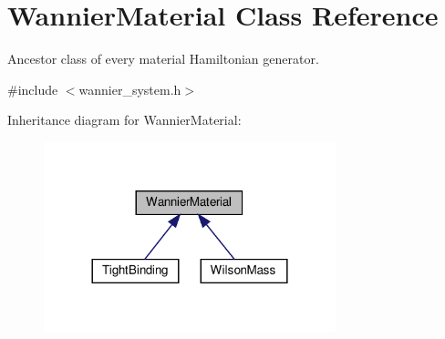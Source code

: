 \hypertarget{class_wannier_material}{}\section{Wannier\+Material Class Reference}
\label{class_wannier_material}


Ancestor class of every material Hamiltonian generator.  




{\ttfamily \#include $<$wannier\+\_\+system.\+h$>$}



Inheritance diagram for Wannier\+Material\+:
\nopagebreak
\begin{figure}[H]
\begin{center}
\leavevmode
\includegraphics[width=240pt]{class_wannier_material__inherit__graph}
\end{center}
\end{figure}
